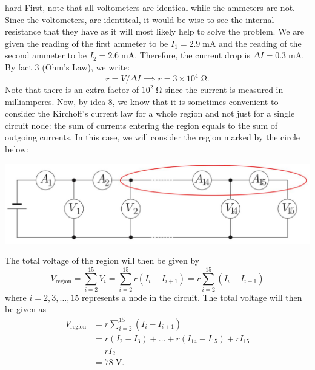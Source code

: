 \begin{solution}{hard}
First, note that all voltometers are identical while the ammeters are not. Since the voltometers, are identitcal, it would be wise to see the internal resistance that they have as it will most likely help to solve the problem. We are given the reading of the first ammeter to be $I_1 = 2.9\;\mathrm{mA}$ and the reading of the second ammeter to be $I_2 = 2.6\;\mathrm{mA}$. Therefore, the current drop is $\Delta I = 0.3\;\mathrm{mA}$. By fact 3 (Ohm's Law), we write:
\[r = V/\Delta I \implies r = 3\times 10^4\;\mathrm{\Omega}.\]Note that there is an extra factor of $10^{2}\;\mathrm{\Omega}$ since the current is measured in milliamperes. Now, by idea 8, we know that it is sometimes convenient to consider the Kirchoff’s current law for a whole region and not just for a single circuit node: the sum of currents entering the region equals to the sum of outgoing currents. In this case, we will consider the region marked by the circle below:

\begin{center}
    \includegraphics[width=0.6\linewidth]{Figures/7_sol.jpg}
\end{center}

The total voltage of the region will then be given by
\[V_{\text{region}} = \sum_{i = 2}^{15} V_i = \sum_{i = 2}^{15} r (I_i - I_{i  +1}) = r\sum_{i = 2}^{15} (I_i - I_{i  +1})\]where $i = 2, 3, \dots, 15$ represents a node in the circuit. The total voltage will then be given as
\begin{align*}
V_{\text{region}} &= r\sum_{i = 2}^{15} (I_i - I_{i  +1})\\
&= r(I_2-I_3) + \dots + r(I_{14}-I_{15}) + rI_{15}  \\
&= rI_2 \\
& = \boxed{78\;\mathrm{V}}.
\end{align*}
\end{solution}